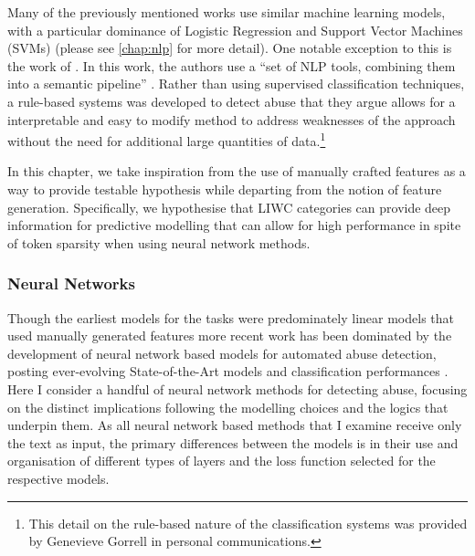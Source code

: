 Many of the previously mentioned works use similar machine learning models, with a particular dominance of Logistic Regression and Support Vector Machines (SVMs) (please see \autoref{chap:nlp} for more detail). One notable exception to this is the work of \citet{Gorrell:2018}. In this work, the authors use a ``set of NLP tools, combining them into a semantic pipeline'' \citep[pp. 601]{Gorrell:2018}. Rather than using supervised classification techniques, a rule-based systems was developed to detect abuse that they argue allows for a interpretable and easy to modify method to address weaknesses of the approach without the need for additional large quantities of data.\footnote{This detail on the rule-based nature of the classification systems was provided by Genevieve Gorrell in personal communications.}

In this chapter, we take inspiration from the use of manually crafted features as a way to provide testable hypothesis while departing from the notion of feature generation. Specifically, we hypothesise that LIWC categories can provide deep information for predictive modelling that can allow for high performance in spite of token sparsity when using neural network methods.

\subsubsection{Neural Networks}
Though the earliest models for the tasks were predominately linear models that used manually generated features \citep{Waseem-Hovy:2016,Davidson:2017,Warner:2012} more recent work has been dominated by the development of neural network based models for automated abuse detection, posting ever-evolving State-of-the-Art models and classification performances \citep[e.g.]{Park:2017,Badjatiya:2017,Zimmerman:2018,Stoop:2019,Isaksen:2020}. Here I consider a handful of neural network methods for detecting abuse, focusing on the distinct implications following the modelling choices and the logics that underpin them. As all neural network based methods that I examine receive only the text as input, the primary differences between the models is in their use and organisation of different types of layers and the loss function selected for the respective models.

